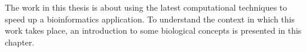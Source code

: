The work in this thesis is about using the latest computational techniques to speed up a bioinformatics application. To understand the context in which this work takes place, an introduction to some biological concepts is presented in this chapter.
